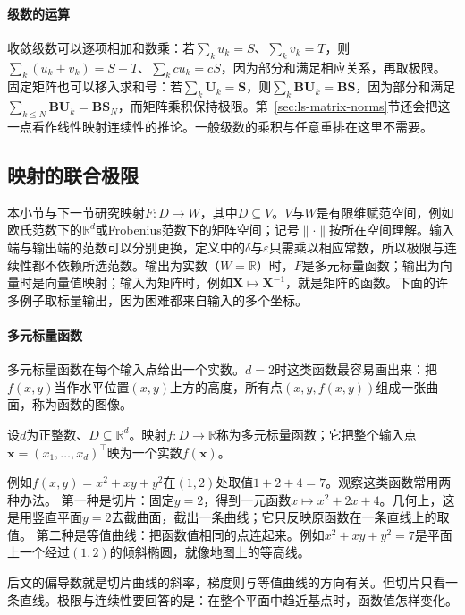 \paragraph{级数的运算}
收敛级数可以逐项相加和数乘：若$\sum_ku_k=S$、$\sum_kv_k=T$，则$\sum_k(u_k+v_k)=S+T$、$\sum_kcu_k=cS$，因为部分和满足相应关系，再取极限。固定矩阵也可以移入求和号：若$\sum_k\bm U_k=\bm S$，则$\sum_k\bm B\bm U_k=\bm B\bm S$，因为部分和满足$\sum_{k\leq N}\bm B\bm U_k=\bm B\bm S_N$，而矩阵乘积保持极限。第~\ref{sec:ls-matrix-norms}节还会把这一点看作线性映射连续性的推论。一般级数的乘积与任意重排在这里不需要。

\subsection{映射的联合极限}
\label{sec:multivariable-joint-limit-section}

本小节与下一节研究映射$F:D\to W$，其中$D\subseteq V$。$V$与$W$是有限维赋范空间，例如欧氏范数下的$\mathbb R^d$或Frobenius范数下的矩阵空间；记号$\lVert\cdot\rVert$按所在空间理解。输入端与输出端的范数可以分别更换，定义中的$\delta$与$\varepsilon$只需乘以相应常数，所以极限与连续性都不依赖所选范数。输出为实数（$W=\mathbb R$）时，$F$是多元标量函数；输出为向量时是向量值映射；输入为矩阵时，例如$\bm X\mapsto\bm X^{-1}$，就是矩阵的函数。下面的许多例子取标量输出，因为困难都来自输入的多个坐标。

\paragraph{多元标量函数}
多元标量函数在每个输入点给出一个实数。$d=2$时这类函数最容易画出来：把$f(x,y)$当作水平位置$(x,y)$上方的高度，所有点$(x,y,f(x,y))$组成一张曲面，称为函数的图像。
\begin{definition}[多元标量函数]
\label{def:multivariable-scalar-function}
设$d$为正整数、$D\subseteq\mathbb R^d$。映射$f:D\to\mathbb R$称为多元标量函数；它把整个输入点$\bm x=(x_1,\ldots,x_d)^\top$映为一个实数$f(\bm x)$。
\end{definition}
例如$f(x,y)=x^2+xy+y^2$在$(1,2)$处取值$1+2+4=7$。观察这类函数常用两种办法。
第一种是切片：固定$y=2$，得到一元函数$x\mapsto x^2+2x+4$。几何上，这是用竖直平面$y=2$去截曲面，截出一条曲线；它只反映原函数在一条直线上的取值。
第二种是等值曲线：把函数值相同的点连起来。例如$x^2+xy+y^2=7$是平面上一个经过$(1,2)$的倾斜椭圆，就像地图上的等高线。

后文的偏导数就是切片曲线的斜率，梯度则与等值曲线的方向有关。但切片只看一条直线。极限与连续性要回答的是：在整个平面中趋近基点时，函数值怎样变化。

